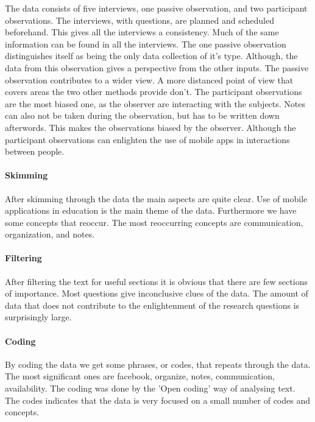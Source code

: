 \documentclass[12pt, a4paper]{article}
\begin{document}
The data consists of five interviews, one passive observation, and two
participant observations. The interviews, with questions, are planned and
scheduled beforehand. This gives all the interviews a consistency. Much of the
same information can be found in all the interviews. The one passive
observation distinguishes itself as being the only data collection of it's
type. Although, the data from this observation gives a perspective from the
other inputs. The passive observation contributes to a wider view. A more
distanced point of view that covers areas the two other methods provide don't. 
The participant observations are the most biased one, as the observer are
interacting with the subjects. Notes can also not be taken during the
observation, but has to be written down afterwords. This makes the observations
biased by the observer. Although the participant observations can enlighten the
use of mobile apps in interactions between people.  

\paragraph{Skimming} 
After skimming through the data the main aspects are quite clear. Use of mobile
applications in education is the main theme of the data. Furthermore we have
some concepts that reoccur. The most reoccurring concepts are communication,
organization, and notes. 

\paragraph{Filtering} 
After filtering the text for useful sections it is obvious that there are few
sections of importance. Most questions give inconclusive clues of the data. 
The amount of data that does not contribute to the
enlightenment of the research questions is surprisingly large.  

\paragraph{Coding}
By coding the data we get some phrases, or codes, that repeats through the
data. The most significant ones are facebook, organize, notes, communication,
availability. The coding was done by the 'Open coding' way of analysing text. 
The codes indicates that the data is very focused on a small number of codes
and concepts. 
\end{document}
